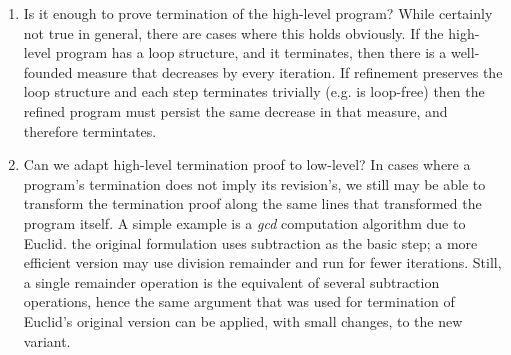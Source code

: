 \begin{enumerate}
  \item Is it enough to prove termination of the high-level program?
    While certainly not true in general, there are cases where this holds
    obviously. If the high-level program has a loop structure, and it terminates,
    then there is a well-founded measure that decreases by every iteration.
    If refinement preserves the loop structure and each step terminates trivially
    (e.g.  is loop-free) then the refined program must persist the same
    decrease in that measure, and therefore termintates.
  \item Can we adapt high-level termination proof to low-level?
    In cases where a program's termination does not imply its revision's,
    we still may be able to transform the termination proof along the same
    lines that transformed the program itself.
    A simple example is a \textit{gcd} computation algorithm due to Euclid.
    the original formulation uses subtraction as the basic step;
    a more efficient version may use division remainder and run for fewer
    iterations.
    Still, a single remainder operation is the equivalent of several subtraction
    operations, hence the same argument that was used for termination of
    Euclid's original version can be applied, with small changes, to the new variant.
\end{enumerate}
